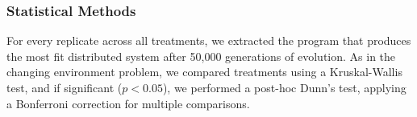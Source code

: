 \subsubsection{Statistical Methods}

For every replicate across all treatments, we extracted the program that produces the most fit distributed system after 50,000 generations of evolution. 
As in the changing environment problem, we compared treatments using a Kruskal-Wallis test, and if significant ($p < 0.05$), we performed a post-hoc Dunn's test, applying a Bonferroni correction for multiple comparisons.  
